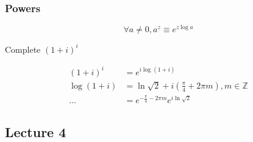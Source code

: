 \documentclass[../notes.tex]{subfiles}
\begin{document}
\subsubsection{Powers}


\begin{definition}
	\begin{equation}
		\forall a \neq  0, a^z \equiv e^{z \log a}
	\end{equation}
\end{definition}

\begin{example}
	Complete $ (1+i)^i $ 


	\begin{equation}
		\begin{split}
			(1+i)^i &= e^{i \log (1+i)}  \\
			 \log(1+i) &= \ln\sqrt{2} + i (\frac{\pi}{4} + 2 \pi m), m \in \mathbb{Z}   \\
		 \ldots &= e^{-\frac{\pi}{4} - 2\pi m} e^{i \ln \sqrt{2} }
		\end{split}
	\end{equation}
	



\end{example}






\subsection{Lecture 4}
\end{document}
